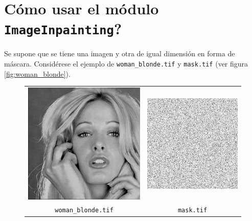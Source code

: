 \section{\textquestiondown C\'omo usar el m\'odulo \texttt{ImageInpainting}?}
Se supone que se tiene una imagen y otra de igual dimensión en forma de m\'ascara. Considérese el ejemplo de  \texttt{woman\_blonde.tif} y \texttt{mask.tif} (ver figura \ref{fig:woman_blonde}).
\begin{figure}[H]
	\centering
	\begin{tabular}{cc}
		\includegraphics[scale=0.2]{Graphics/Examples/woman_blonde.png}&
		\includegraphics[scale=0.2]{Graphics/Examples/mask.tif}\\
		\tiny\texttt{woman\_blonde.tif}&\tiny\texttt{mask.tif}\\
	\end{tabular}
	

\end{figure}
